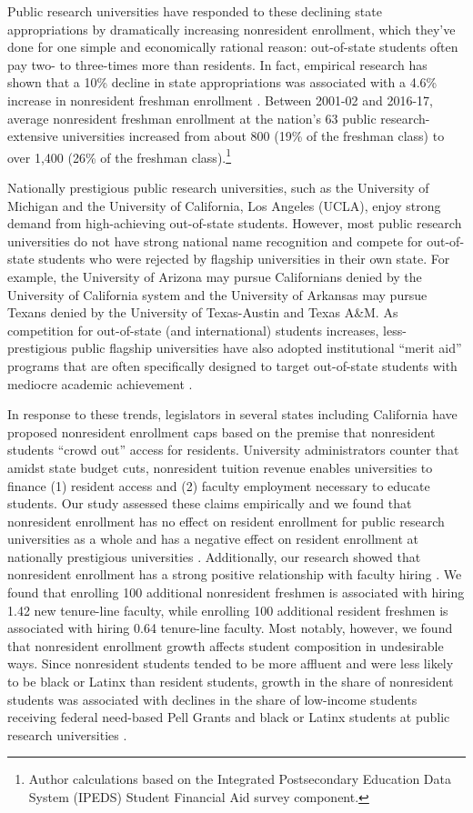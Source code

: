 \documentclass{article}
\begin{document}
Public research universities have responded to these declining state appropriations by dramatically increasing nonresident enrollment, which they’ve done for one simple and economically rational reason: out-of-state students often pay two- to three-times more than residents. In fact, empirical research has shown that a 10\% decline in state appropriations was associated with a 4.6\% increase in nonresident freshman enrollment \citep{RN3753}. Between 2001-02 and 2016-17, average nonresident freshman enrollment at the nation's 63 public research-extensive universities increased from about 800 (19\% of the freshman class) to over 1,400 (26\% of the freshman class).\footnote{Author calculations based on the Integrated Postsecondary Education Data System (IPEDS) Student Financial Aid survey component.}

Nationally prestigious public research universities, such as the University of Michigan and the University of California, Los Angeles (UCLA), enjoy strong demand from high-achieving out-of-state students. However, most public research universities do not have strong national name recognition and compete for out-of-state students who were rejected by flagship universities in their own state. For example, the University of Arizona may pursue Californians denied by the University of California system and the University of Arkansas may pursue Texans denied by the University of Texas-Austin and Texas A\&M. As competition for out-of-state (and international) students increases, less-prestigious public flagship universities have also adopted institutional ``merit aid'' programs that are often specifically designed to target out-of-state students with mediocre academic achievement \citep{RN4409, RN4032, RN3519, RN3762, RN4494}.

In response to these trends, legislators in several states including California have proposed nonresident enrollment caps based on the premise that nonresident students ``crowd out'' access for residents. University administrators counter that amidst state budget cuts, nonresident tuition revenue enables universities to finance (1) resident access and (2) faculty employment necessary to educate students. Our study assessed these claims empirically and we found that nonresident enrollment has no effect on resident enrollment for public research universities as a whole and has a negative effect on resident enrollment at nationally prestigious universities \citep{RN4290}. Additionally, our research showed that nonresident enrollment has a strong positive relationship with faculty hiring \citep{RN4492}. We found that enrolling 100 additional nonresident freshmen is associated with hiring 1.42 new tenure-line faculty, while enrolling 100 additional resident freshmen is associated with hiring 0.64 tenure-line faculty. Most notably, however, we found that nonresident enrollment growth affects student composition in undesirable ways. Since nonresident students tended to be more affluent and were less likely to be black or Latinx than resident students, growth in the share of nonresident students was associated with declines in the share of low-income students receiving federal need-based Pell Grants and black or Latinx students at public research universities \citep{RN3685}.
\end{document}
